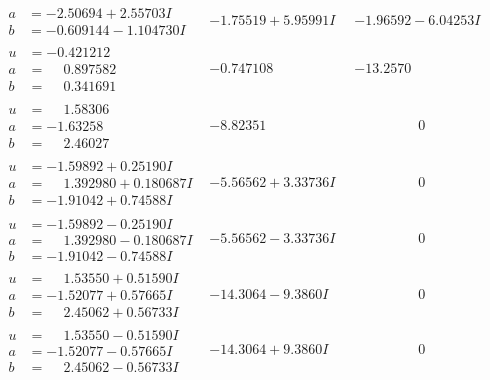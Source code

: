 \documentclass[1p]{elsarticle_modified}
\theoremstyle{definition}
\begin{document}
$$\begin{array}{c|c|c}
\begin{aligned}
a &= -2.50694 + 2.55703 I \\
b &= -0.609144 - 1.104730 I\end{aligned}
 & -1.75519 + 5.95991 I & -1.96592 - 6.04253 I \\ \hline\begin{aligned}
u &= -0.421212\phantom{ +0.000000I} \\
a &= \phantom{-}0.897582\phantom{ +0.000000I} \\
b &= \phantom{-}0.341691\phantom{ +0.000000I}\end{aligned}
 & -0.747108\phantom{ +0.000000I} & -13.2570\phantom{ +0.000000I} \\ \hline\begin{aligned}
u &= \phantom{-}1.58306\phantom{ +0.000000I} \\
a &= -1.63258\phantom{ +0.000000I} \\
b &= \phantom{-}2.46027\phantom{ +0.000000I}\end{aligned}
 & -8.82351\phantom{ +0.000000I} & \phantom{-0.000000 } 0 \\ \hline\begin{aligned}
u &= -1.59892 + 0.25190 I \\
a &= \phantom{-}1.392980 + 0.180687 I \\
b &= -1.91042 + 0.74588 I\end{aligned}
 & -5.56562 + 3.33736 I & \phantom{-0.000000 } 0 \\ \hline\begin{aligned}
u &= -1.59892 - 0.25190 I \\
a &= \phantom{-}1.392980 - 0.180687 I \\
b &= -1.91042 - 0.74588 I\end{aligned}
 & -5.56562 - 3.33736 I & \phantom{-0.000000 } 0 \\ \hline\begin{aligned}
u &= \phantom{-}1.53550 + 0.51590 I \\
a &= -1.52077 + 0.57665 I \\
b &= \phantom{-}2.45062 + 0.56733 I\end{aligned}
 & -14.3064 - 9.3860 I & \phantom{-0.000000 } 0 \\ \hline\begin{aligned}
u &= \phantom{-}1.53550 - 0.51590 I \\
a &= -1.52077 - 0.57665 I \\
b &= \phantom{-}2.45062 - 0.56733 I\end{aligned}
 & -14.3064 + 9.3860 I & \phantom{-0.000000 } 0\\

\end{array}$$
\end{document}
